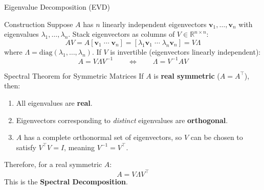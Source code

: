 \documentclass{beamer}
\begin{document}
\begin{frame}[shrink=10]{Eigenvalue Decomposition (EVD)}
  \begin{block}{Construction}
    Suppose $A$ has $n$ linearly independent eigenvectors
    $\mathbf{v}_1, \ldots, \mathbf{v}_n$ with eigenvalues
    $\lambda_1, \ldots, \lambda_n$.
    Stack eigenvectors as columns of $V \in \mathbb{R}^{n \times n}$:
    \[
      AV
        = A[\mathbf{v}_1 \;\cdots\; \mathbf{v}_n]
        = [\lambda_1\mathbf{v}_1 \;\cdots\; \lambda_n\mathbf{v}_n]
        = V\Lambda
    \]
    where $\Lambda = \mathrm{diag}(\lambda_1,\ldots,\lambda_n)$.
    If $V$ is invertible (eigenvectors linearly independent):
    \[
      \boxed{A = V\Lambda V^{-1}}
      \qquad\Longleftrightarrow\qquad
      \Lambda = V^{-1}AV
    \]
  \end{block}

  \medskip

  \begin{block}{Spectral Theorem for Symmetric Matrices}
    If $A$ is \textbf{real symmetric} ($A = A^\top$), then:
    \begin{enumerate}\setlength\itemsep{4pt}
      \item All eigenvalues are \textbf{real}.
      \item Eigenvectors corresponding to \emph{distinct} eigenvalues
            are \textbf{orthogonal}.
      \item $A$ has a complete orthonormal set of eigenvectors, so
            $V$ can be chosen to satisfy $V^\top V = I$,
            meaning $V^{-1} = V^\top$.
    \end{enumerate}
    Therefore, for a real symmetric $A$:
    \[
      \boxed{A = V\Lambda V^\top}
    \]
    This is the \textbf{Spectral Decomposition}.
  \end{block}
\end{frame}
\end{document}
